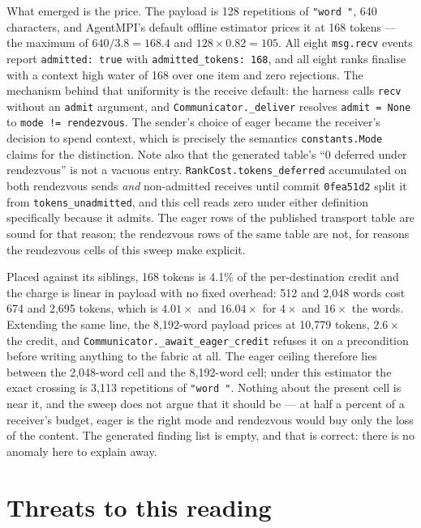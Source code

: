 \documentclass[11pt]{article}
\begin{document}
What emerged is the price. The payload is 128 repetitions of \texttt{"word "}, 640
characters, and AgentMPI's default offline estimator prices it at 168 tokens --- the
maximum of $640/3.8 = 168.4$ and $128 \times 0.82 = 105$. All eight
\texttt{msg.recv} events report \texttt{admitted: true} with
\texttt{admitted\_tokens: 168}, and all eight ranks finalise with a context high
water of 168 over one item and zero rejections. The mechanism behind that uniformity
is the receive default: the harness calls \texttt{recv} without an \texttt{admit}
argument, and \texttt{Communicator.\_deliver} resolves \texttt{admit = None} to
\texttt{mode != rendezvous}. The sender's choice of eager became the receiver's
decision to spend context, which is precisely the semantics
\texttt{constants.Mode} claims for the distinction. Note also that the generated
table's ``0 deferred under rendezvous'' is not a vacuous entry. \texttt{RankCost.tokens\_deferred}
accumulated on both rendezvous sends \emph{and} non-admitted receives until commit
\texttt{0fea51d2} split it from \texttt{tokens\_unadmitted}, and this cell reads zero
under either definition specifically because it admits. The eager rows of the
published transport table are sound for that reason; the rendezvous rows of the same
table are not, for reasons the rendezvous cells of this sweep make explicit.

Placed against its siblings, 168 tokens is 4.1\% of the per-destination credit and
the charge is linear in payload with no fixed overhead: 512 and 2{,}048 words cost
674 and 2{,}695 tokens, which is $4.01\times$ and $16.04\times$ for $4\times$ and
$16\times$ the words. Extending the same line, the 8{,}192-word payload prices at
10{,}779 tokens, $2.6\times$ the credit, and
\texttt{Communicator.\_await\_eager\_credit} refuses it on a precondition before
writing anything to the fabric at all. The eager ceiling therefore lies between the
2{,}048-word cell and the 8{,}192-word cell; under this estimator the exact crossing
is 3{,}113 repetitions of \texttt{"word "}. Nothing about the present cell is near
it, and the sweep does not argue that it should be --- at half a percent of a
receiver's budget, eager is the right mode and rendezvous would buy only the loss of
the content. The generated finding list is empty, and that is correct: there is no
anomaly here to explain away.

\section{Threats to this reading}
\end{document}
